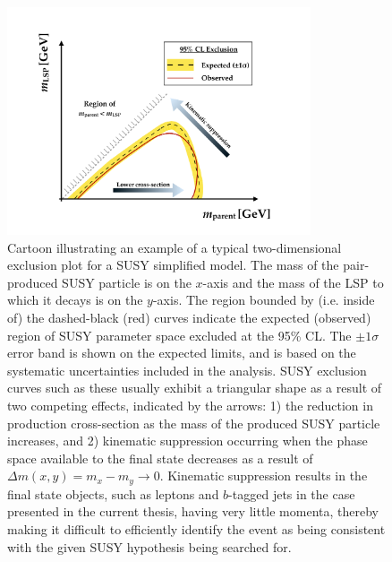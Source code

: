 \begin{figure}[!htb]
    \begin{center}
        \includegraphics[width=0.8\textwidth]{figures/search_stop2l/susy_exclusion_cartoonPDF}
        \caption{
            Cartoon illustrating an example of a typical two-dimensional exclusion plot
            for a SUSY simplified model.
            The mass of the pair-produced SUSY particle is on the $x$-axis and the mass of the
            LSP to which it decays is on the $y$-axis.
            The region bounded by (i.e. inside of) the dashed-black (red) curves indicate
            the expected (observed) region of SUSY parameter space excluded at the 95\% CL.
            The $\pm 1\sigma$ error band is shown on the expected limits, and is based on the
            systematic uncertainties included in the analysis.
            SUSY exclusion curves such as these usually exhibit a triangular shape as a result
            of two competing effects, indicated by the arrows: 1) the reduction in production
            cross-section as the mass of the produced SUSY particle increases, and 2) kinematic
            suppression occurring when the phase space available to the final state decreases
            as a result of $\Delta m (x, y) = m_x - m_y \rightarrow 0$.
            Kinematic suppression results in the final state objects, such as leptons and $b$-tagged jets
            in the case presented in the current thesis,
            having very little momenta, thereby making it difficult to efficiently identify
            the event as being consistent with the given SUSY hypothesis being searched for.
        }
        \label{fig:susy_exclusion_cartoon}
    \end{center}
\end{figure}

